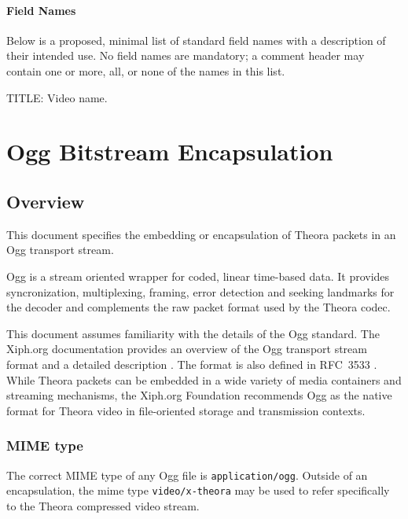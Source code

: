 \documentclass[11pt,letterpaper]{article}
\begin{document}
\paragraph{Field Names}

Below is a proposed, minimal list of standard field names with a description of
 their intended use.
No field names are mandatory; a comment header may contain one or more, all, or
 none of the names in this list.

\begin{description}
\item{TITLE:} Video name.
\end{description}

\appendix

\section{Ogg Bitstream Encapsulation}
\label{app:oggencapsulation}

\subsection{Overview}

This document specifies the embedding or encapsulation of Theora packets
 in an Ogg transport stream.

Ogg is a stream oriented wrapper for coded, linear time-based data.
It provides syncronization, multiplexing, framing, error detection and
 seeking landmarks for the decoder and complements the raw packet format
 used by the Theora codec.

This document assumes familiarity with the details of the Ogg standard.
The Xiph.org documentation provides an overview of the Ogg transport stream
 format \cite{oggstream} and a detailed description \cite{oggframe}.
The format is also defined in RFC~3533 \cite{rfc3533}.
While Theora packets can be embedded in a wide variety of media
 containers and streaming mechanisms, the Xiph.org Foundation
 recommends Ogg as the native format for Theora video in file-oriented
 storage and transmission contexts.

\subsubsection{MIME type}

The correct MIME type of any Ogg file is {\tt application/ogg}.
Outside of an encapsulation, the mime type {\tt video/x-theora} may
 be used to refer specifically to the Theora compressed video stream.
\end{document}
